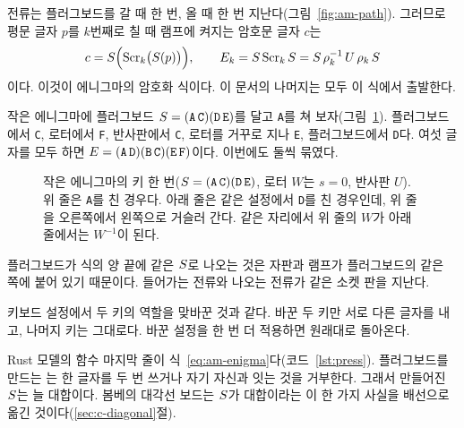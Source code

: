 전류는 플러그보드를 갈 때 한 번, 올 때 한 번 지난다(그림~\ref{fig:am-path}). 그러므로 평문 글자 $p$를 $k$번째로
칠 때 램프에 켜지는 암호문 글자 $c$는
\begin{equation}
  c = S\Bigl(\mathrm{Scr}_k\bigl(S(p)\bigr)\Bigr), \qquad
  E_k = S\,\mathrm{Scr}_k\,S = S\,\rho_k^{-1}\,U\,\rho_k\,S \label{eq:am-enigma}
\end{equation}
이다. 이것이 에니그마의 암호화 식이다. 이 문서의 나머지는 모두 이 식에서 출발한다.

작은 에니그마에 플러그보드 $S = (\mathtt{A\,C})(\mathtt{D\,E})$를 달고 \texttt{A}를 쳐 보자(그림~\ref{fig:am-toy-path}).
플러그보드에서 \texttt{C}, 로터에서 \texttt{F}, 반사판에서 \texttt{C}, 로터를 거꾸로 지나 \texttt{E}, 플러그보드에서
\texttt{D}다. 여섯 글자를 모두 하면 $E = (\mathtt{A\,D})(\mathtt{B\,C})(\mathtt{E\,F})$이다. 이번에도 둘씩 묶였다.

\begin{figure}[ht]
\centering
{}
\caption{작은 에니그마의 키 한 번($S = (\mathtt{A\,C})(\mathtt{D\,E})$, 로터 $W$는 $s=0$, 반사판 $U$). 위 줄은
\texttt{A}를 친 경우다. 아래 줄은 같은 설정에서 \texttt{D}를 친 경우인데, 위 줄을 오른쪽에서 왼쪽으로 거슬러
간다. 같은 자리에서 위 줄의 $W$가 아래 줄에서는 $W^{-1}$이 된다.}
\label{fig:am-toy-path}
\end{figure}

\Why 플러그보드가 식의 양 끝에 같은 $S$로 나오는 것은 자판과 램프가 플러그보드의 같은 쪽에 붙어 있기
때문이다. 들어가는 전류와 나오는 전류가 같은 소켓 판을 지난다.

\General 키보드 설정에서 두 키의 역할을 맞바꾼 것과 같다. 바꾼 두 키만 서로 다른 글자를 내고, 나머지 키는 그대로다.
바꾼 설정을 한 번 더 적용하면 원래대로 돌아온다.

\Ours Rust 모델의  함수 마지막 줄이 식~\eqref{eq:am-enigma}다(코드~\ref{lst:press}). 플러그보드를 만드는
는 한 글자를 두 번 쓰거나 자기 자신과 잇는 것을 거부한다. 그래서 만들어진 $S$는 늘
대합이다. 봄베의 대각선 보드는 $S$가 대합이라는 이 한 가지 사실을 배선으로 옮긴 것이다(\ref{sec:c-diagonal}절).


